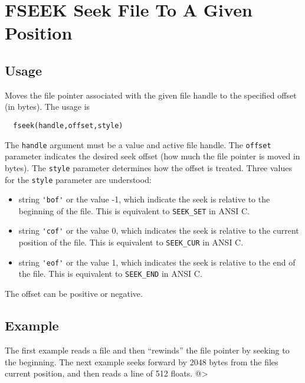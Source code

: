 \section{FSEEK Seek File To A Given Position}

\subsection{Usage}

Moves the file pointer associated with the given file handle to 
the specified offset (in bytes).  The usage is
\begin{verbatim}
  fseek(handle,offset,style)
\end{verbatim}
The \verb|handle| argument must be a value and active file handle.  The
\verb|offset| parameter indicates the desired seek offset (how much the
file pointer is moved in bytes).  The \verb|style| parameter determines
how the offset is treated.  Three values for the \verb|style| parameter
are understood:
\begin{itemize}
\item  string \verb|'bof'| or the value -1, which indicate the seek is relative
to the beginning of the file.  This is equivalent to \verb|SEEK_SET| in
ANSI C.

\item  string \verb|'cof'| or the value 0, which indicates the seek is relative
to the current position of the file.  This is equivalent to 
\verb|SEEK_CUR| in ANSI C.

\item  string \verb|'eof'| or the value 1, which indicates the seek is relative
to the end of the file.  This is equivalent to \verb|SEEK_END| in ANSI
C.

\end{itemize}
The offset can be positive or negative.
\subsection{Example}

The first example reads a file and then ``rewinds'' the file pointer by seeking to the beginning.
The next example seeks forward by 2048 bytes from the files current position, and then reads a line of 512 floats.
@>
